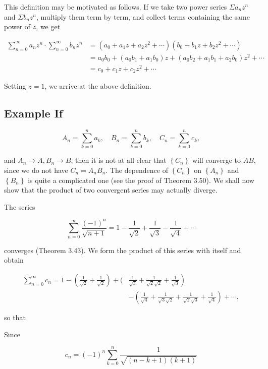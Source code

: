 \documentclass[10pt]{article}
\begin{document}
This definition may be motivated as follows. If we take two power series $\Sigma a_{n} z^{n}$ and $\Sigma b_{n} z^{n}$, multiply them term by term, and collect terms containing the same power of $z$, we get

$$
\begin{aligned}
\sum_{n=0}^{\infty} a_{n} z^{n} \cdot \sum_{n=0}^{\infty} b_{n} z^{n} & =\left(a_{0}+a_{1} z+a_{2} z^{2}+\cdots\right)\left(b_{0}+b_{1} z+b_{2} z^{2}+\cdots\right) \\
& =a_{0} b_{0}+\left(a_{0} b_{1}+a_{1} b_{0}\right) z+\left(a_{0} b_{2}+a_{1} b_{1}+a_{2} b_{0}\right) z^{2}+\cdots \\
& =c_{0}+c_{1} z+c_{2} z^{2}+\cdots
\end{aligned}
$$

Setting $z=1$, we arrive at the above definition.

\subsection{Example If}
$$
A_{n}=\sum_{k=0}^{n} a_{k}, \quad B_{n}=\sum_{k=0}^{n} b_{k}, \quad C_{n}=\sum_{k=0}^{n} c_{k},
$$

and $A_{n} \rightarrow A, B_{n} \rightarrow B$, then it is not at all clear that $\left\{C_{n}\right\}$ will converge to $A B$, since we do not have $C_{n}=A_{n} B_{n}$. The dependence of $\left\{C_{n}\right\}$ on $\left\{A_{n}\right\}$ and $\left\{B_{n}\right\}$ is quite a complicated one (see the proof of Theorem 3.50). We shall now show that the product of two convergent series may actually diverge.

The series

$$
\sum_{n=0}^{\infty} \frac{(-1)^{n}}{\sqrt{n+1}}=1-\frac{1}{\sqrt{2}}+\frac{1}{\sqrt{3}}-\frac{1}{\sqrt{4}}+\cdots
$$

converges (Theorem 3.43). We form the product of this series with itself and obtain

$$
\begin{aligned}
\sum_{n=0}^{\infty} c_{n}=1-\left(\frac{1}{\sqrt{2}}+\frac{1}{\sqrt{2}}\right)+( & \left.\frac{1}{\sqrt{3}}+\frac{1}{\sqrt{2} \sqrt{2}}+\frac{1}{\sqrt{3}}\right) \\
& -\left(\frac{1}{\sqrt{4}}+\frac{1}{\sqrt{3} \sqrt{2}}+\frac{1}{\sqrt{2} \sqrt{3}}+\frac{1}{\sqrt{4}}\right)+\cdots,
\end{aligned}
$$

so that

Since

$$
c_{n}=(-1)^{n} \sum_{k=0}^{n} \frac{1}{\sqrt{(n-k+1)(k+1)}}
$$
\end{document}
